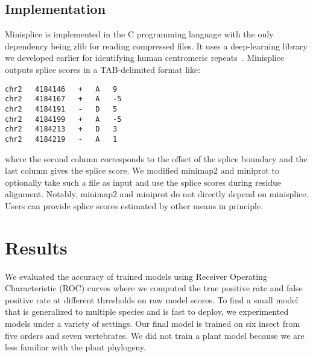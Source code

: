\documentclass[webpdf,contemporary,large,namedate]{oup-authoring-template}%
\begin{document}
\subsection{Implementation}

Minisplice is implemented in the C programming language with the only dependency
being zlib for reading compressed files.
It uses a deep-learning library we developed earlier for identifying human centromeric repeats~\citep{Li:2019aa}.
Minisplice outputs splice scores in a TAB-delimited format like:
\begin{verbatim}
chr2   4184146   +   A   9
chr2   4184167   +   A   -5
chr2   4184191   -   D   5
chr2   4184199   +   A   -5
chr2   4184213   +   D   3
chr2   4184219   -   A   1
\end{verbatim}
where the second column corresponds to the offset of the splice boundary
and the last column gives the splice score.
We modified minimap2 and miniprot to optionally take such a file as input
and use the splice scores during residue alignment.
Notably, minimap2 and miniprot do not directly depend on minisplice.
Users can provide splice scores estimated by other means in principle.

\section{Results}

We evaluated the accuracy of trained models using Receiver Operating Characteristic (ROC) curves
where we computed the true positive rate and false positive rate at different thresholds on raw model scores.
To find a small model that is generalized to multiple species and is fast to deploy,
we experimented models under a variety of settings.
Our final model is trained on six insect from five orders and seven vertebrates.
We did not train a plant model because we are less familiar with the plant phylogeny.
\end{document}
